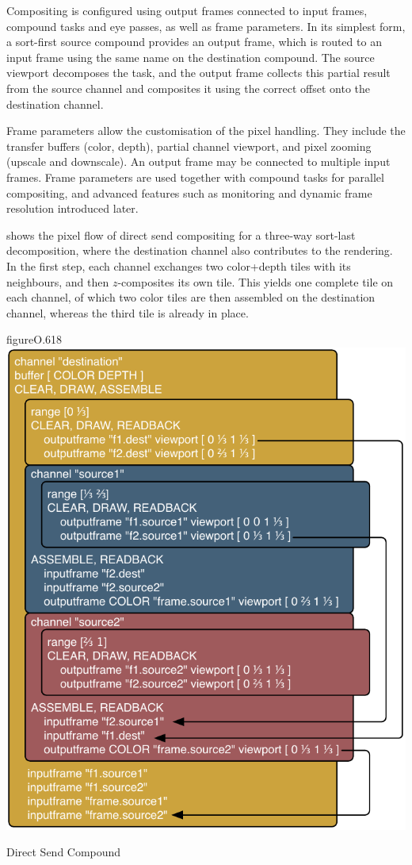 Compositing is configured using output frames connected to input frames,
compound tasks and eye passes, as well as frame parameters. In its simplest
form, a sort-first source compound provides an output frame, which is routed
to an input frame using the same name on the destination compound. The source
viewport decomposes the task, and the output frame collects this partial result
from the source channel and composites it using the correct offset onto the
destination channel.

Frame parameters allow the customisation of the pixel handling. They include the
transfer buffers (color, depth), partial channel viewport, and pixel zooming
(upscale and downscale). An output frame may be connected to multiple input
frames. Frame parameters are used together with compound tasks for
parallel compositing, and advanced features such as monitoring and dynamic frame
resolution introduced later.

 shows the pixel flow of direct send compositing for a three-way
sort-last decomposition, where the destination channel also contributes to the
rendering. In the first step, each channel exchanges two color+depth tiles with
its neighbours, and then $z$-composites its own tile. This yields one complete
tile on each channel, of which two color tiles are then assembled on the
destination channel, whereas the third tile is already in place.

\begin{wrapfloat}{figure}{O}{.618\textwidth}
  \includegraphics[width=.618\textwidth]{images/directSendCompound}
  {\caption{\label{fDirectSendCmp}Direct Send Compound}}
\end{wrapfloat}


